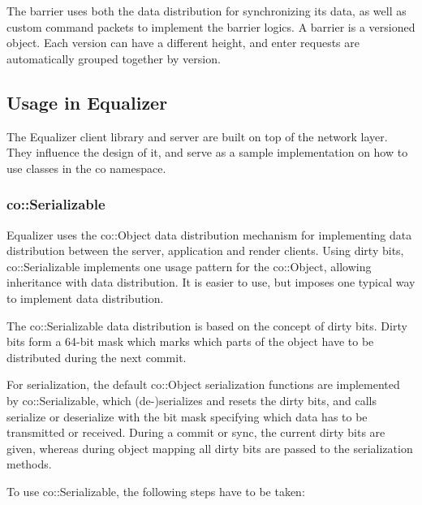 \documentclass[10pt,a4]{scrartcl}
\begin{document}
The barrier uses both the data distribution for synchronizing its data,
as well as custom command packets to implement the barrier logics. A
barrier is a versioned object. Each version can have a different height,
and enter requests are automatically grouped together by version.


\subsection{\label{sNetUsage}Usage in Equalizer}

The Equalizer client library and server are built on top of the network
layer. They influence the design of it, and serve as a sample
implementation on how to use classes in the \textsf{co} namespace.

\subsubsection{\label{sEqObject}co::Serializable}

Equalizer uses the \textsf{co::Object} data distribution mechanism for
implementing data distribution between the server, application and render
clients. Using dirty bits, \textsf{co::Serializable} implements one
usage pattern for the \textsf{co::Object}, allowing inheritance with data
distribution. It is easier to use, but imposes one typical way to implement data
distribution.

The \textsf{co::Serializable} data distribution is based on the concept
of dirty bits. Dirty bits form a 64-bit mask which marks which parts of the
object have to be distributed during the next commit.

For serialization, the default \textsf{co::Object} serialization functions are
implemented by \textsf{co::Serializable}, which (de-)serializes and
resets the dirty bits, and calls \textsf{serialize} or \textsf{deserialize} with
the bit mask specifying which data has to be transmitted or received. During a
commit or sync, the current dirty bits are given, whereas during object mapping
all dirty bits are passed to the serialization methods.

To use \textsf{co::Serializable}, the following steps have to be taken:
\end{document}
